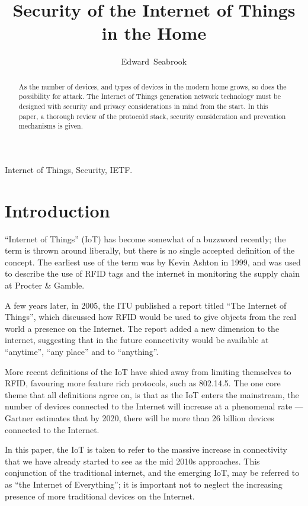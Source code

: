 \documentclass[journal]{IEEEtran}
\begin{document}
\title{Security of the Internet of Things in the Home}
\author{Edward~Seabrook }

\maketitle


\begin{abstract}
As the number of devices, and types of devices in the modern home grows, so
does the possibility for attack. The Internet of Things generation network
technology must be designed with security and privacy considerations in mind
from the start. In this paper, a thorough review of the protocold stack,
security consideration and prevention mechanisms is given. 
\end{abstract}

\begin{IEEEkeywords}
Internet of Things, Security, IETF.
\end{IEEEkeywords}

\IEEEpeerreviewmaketitle

\section{Introduction}
 ``Internet of Things'' (IoT) has become somewhat of a
buzzword recently; the term is thrown around liberally, but there is no single
accepted definition of the concept. The earliest use of the term was by Kevin
Ashton in 1999, and was used to describe the use of RFID tags and the internet
in monitoring the supply chain at Procter \& Gamble. 

A few years later, in 2005, the ITU published a report titled “The Internet of
Things”, which discussed how RFID would be used to give objects from the real
world a presence on the Internet. The report added a new dimension to the
internet, suggesting that in the future connectivity would be available at
``anytime'', ``any place'' and to ``anything''.

More recent definitions of the IoT have shied away from limiting themselves to
RFID, favouring more feature rich protocols, such as 802.14.5. The one core
theme that all definitions agree on, is that as the IoT enters the mainstream,
the number of devices connected to the Internet will increase at a phenomenal
rate — Gartner estimates that by 2020, there will be more than 26 billion
devices connected to the Internet. 

In this paper, the IoT is taken to refer to the massive increase in
connectivity that we have already started to see as the mid 2010s approaches.
This conjunction of the traditional internet, and the emerging IoT, may be
referred to as ``the Internet of Everything''; it is important not to neglect
the increasing presence of more traditional devices on the Internet. 
\end{document}
